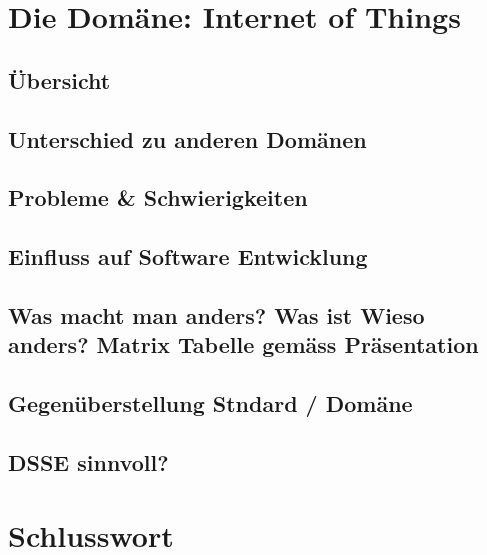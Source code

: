\chapter{Die Domäne: Internet of Things}
\section{Übersicht}

\section{Unterschied zu anderen Domänen}

\section{Probleme \& Schwierigkeiten}

\section{Einfluss auf Software Entwicklung}
\section{Was macht man anders? Was ist Wieso anders? Matrix Tabelle  gemäss Präsentation}

\section{Gegenüberstellung Stndard / Domäne}

\section{DSSE sinnvoll?}


\chapter{Schlusswort}

